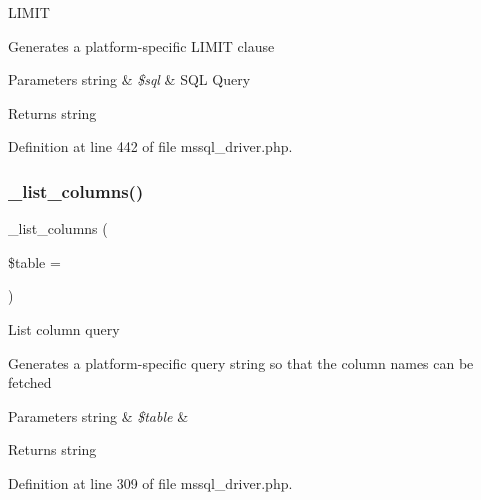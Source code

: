 L\+I\+M\+IT

Generates a platform-\/specific L\+I\+M\+IT clause


\begin{DoxyParams}[1]{Parameters}
string & {\em \$sql} & S\+QL Query \\
\hline
\end{DoxyParams}
\begin{DoxyReturn}{Returns}
string 
\end{DoxyReturn}


Definition at line 442 of file mssql\+\_\+driver.\+php.

\mbox{\label{class_c_i___d_b__mssql__driver_a7ccb7f9c301fe7f0a9db701254142b63}} 
\subsubsection{\texorpdfstring{\_list\_columns()}{\_list\_columns()}}
{\footnotesize\ttfamily \+\_\+list\+\_\+columns (\begin{DoxyParamCaption}\item[{}]{\$table = {\ttfamily \textquotesingle{}\textquotesingle{}} }\end{DoxyParamCaption})\hspace{0.3cm}{\ttfamily [protected]}}

List column query

Generates a platform-\/specific query string so that the column names can be fetched


\begin{DoxyParams}[1]{Parameters}
string & {\em \$table} & \\
\hline
\end{DoxyParams}
\begin{DoxyReturn}{Returns}
string 
\end{DoxyReturn}


Definition at line 309 of file mssql\+\_\+driver.\+php.

\mbox{\label{class_c_i___d_b__mssql__driver_a435c0f3ce54fe7daa178baa8532ebd54}} 
